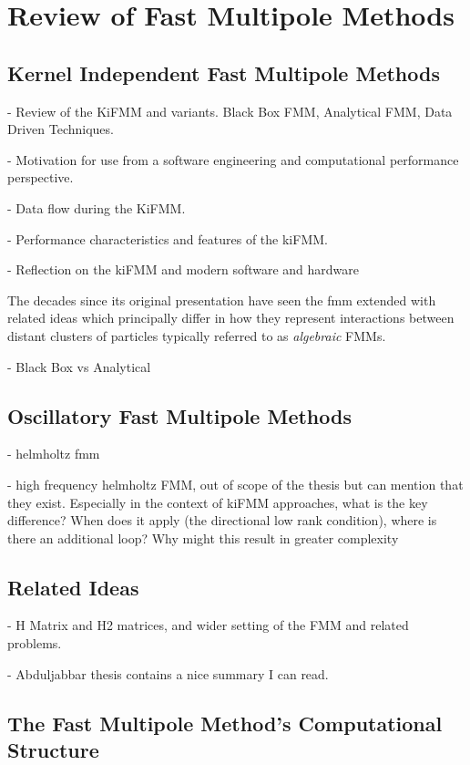 
\chapter{Review of Fast Multipole Methods}\label{chpt:fmm}
\thispagestyle{chaptertitle} %

\section{Kernel Independent Fast Multipole Methods}

- Review of the KiFMM and variants. Black Box FMM, Analytical FMM, Data Driven Techniques.

- Motivation for use from a software engineering and computational performance perspective.

- Data flow during the KiFMM.

- Performance characteristics and features of the kiFMM.

- Reflection on the kiFMM and modern software and hardware

The decades since its original presentation have seen the \acrshort{fmm} extended with related ideas which principally differ in how they represent interactions between distant clusters of particles typically referred to as \textit{algebraic} FMMs.


- Black Box vs Analytical

\section{Oscillatory Fast Multipole Methods}

- helmholtz fmm

- high frequency helmholtz FMM, out of scope of the thesis but can mention that they exist. Especially in the context of kiFMM approaches, what is the key difference? When does it apply (the directional low rank condition), where is there an additional loop? Why might this result in greater complexity

\section{Related Ideas}

- H Matrix and H2 matrices, and wider setting of the FMM and related problems.

- Abduljabbar thesis contains a nice summary I can read.


\section{The Fast Multipole Method's Computational Structure}

